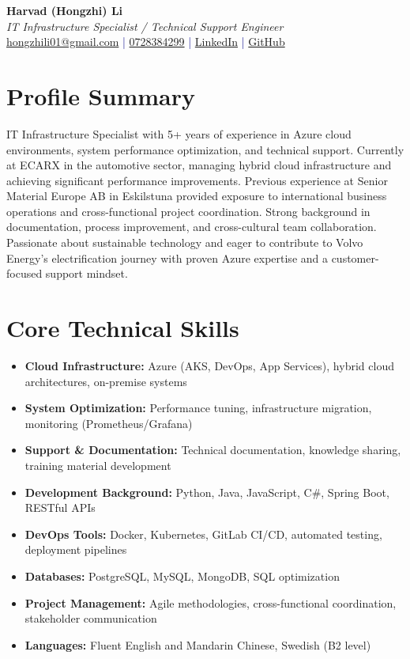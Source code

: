 \documentclass[11pt,a4paper]{article}
\begin{document}
\pagestyle{empty} %

\begin{center}
{\LARGE \textbf{Harvad (Hongzhi) Li}}\\[10pt]
{\Large \textit{IT Infrastructure Specialist / Technical Support Engineer}}\\[10pt]
\textcolor{darkblue}{\href{mailto:hongzhili01@google.com}{hongzhili01@gmail.com} | \href{tel:0728384299}{0728384299} | \href{https://www.linkedin.com/in/harvad/}{LinkedIn} | \href{https://github.com/bluehawana}{GitHub}}
\end{center}

\section*{Profile Summary}
IT Infrastructure Specialist with 5+ years of experience in Azure cloud environments, system performance optimization, and technical support. Currently at ECARX in the automotive sector, managing hybrid cloud infrastructure and achieving significant performance improvements. Previous experience at Senior Material Europe AB in Eskilstuna provided exposure to international business operations and cross-functional project coordination. Strong background in documentation, process improvement, and cross-cultural team collaboration. Passionate about sustainable technology and eager to contribute to Volvo Energy's electrification journey with proven Azure expertise and a customer-focused support mindset.

\section*{Core Technical Skills}
\begin{itemize}[noitemsep]
\item \textbf{Cloud Infrastructure:} Azure (AKS, DevOps, App Services), hybrid cloud architectures, on-premise systems
\item \textbf{System Optimization:} Performance tuning, infrastructure migration, monitoring (Prometheus/Grafana)
\item \textbf{Support \& Documentation:} Technical documentation, knowledge sharing, training material development
\item \textbf{Development Background:} Python, Java, JavaScript, C\#, Spring Boot, RESTful APIs
\item \textbf{DevOps Tools:} Docker, Kubernetes, GitLab CI/CD, automated testing, deployment pipelines
\item \textbf{Databases:} PostgreSQL, MySQL, MongoDB, SQL optimization
\item \textbf{Project Management:} Agile methodologies, cross-functional coordination, stakeholder communication
\item \textbf{Languages:} Fluent English and Mandarin Chinese, Swedish (B2 level)
\end{itemize}
\end{document}
